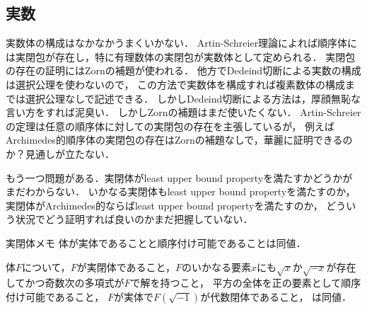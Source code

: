 \subsection{実数}
	実数体の構成はなかなかうまくいかない．
	Artin-Schreier理論によれば順序体には実閉包が存在し，特に有理数体の実閉包が実数体として定められる．
	実閉包の存在の証明にはZornの補題が使われる．
	他方でDedeind切断による実数の構成は選択公理を使わないので，
	この方法で実数体を構成すれば複素数体の構成までは選択公理なしで記述できる．
	しかしDedeind切断による方法は，厚顔無恥な言い方をすれば泥臭い．
	しかしZornの補題はまだ使いたくない．
	Artin-Schreierの定理は任意の順序体に対しての実閉包の存在を主張しているが，
	例えばArchimedes的順序体の実閉包の存在はZornの補題なしで，華麗に証明できるのか？見通しが立たない．
	
	もう一つ問題がある．実閉体がleast upper bound propertyを満たすかどうかがまだわからない． 
	いかなる実閉体もleast upper bound propertyを満たすのか，実閉体がArchimedes的ならばleast upper bound propertyを満たすのか，
	どういう状況でどう証明すれば良いのかまだ把握していない．
	
	\begin{itembox}[l]{実閉体メモ}
		体が実体であることと順序付け可能であることは同値．
		
		体$F$について，$F$が実閉体であること，$F$のいかなる要素$x$にも$\sqrt{x}$か$\sqrt{-x}$が存在してかつ奇数次の多項式が$F$で解を持つこと，
		平方の全体を正の要素として順序付け可能であること，
		$F$が実体で$F(\sqrt{-1})$が代数閉体であること，
		は同値．
	\end{itembox}

